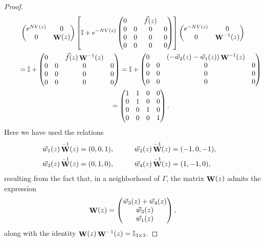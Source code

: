 \documentclass[10pt,a4paper]{amsart}
\DeclareMathOperator{\WW}{{\bf W}}
\begin{document}
\begin{proof}
 \begin{gather*}
 \begin{pmatrix}
 {\rm e}^{NV(z)} & 0 \\
 0 & \WW(z)
 \end{pmatrix}
 \left[
 \mathbb{I} + {\rm e}^{-NV(z)}
 \begin{pmatrix}
 0 & & \vec{f}(z) & \\
 0 & 0 & 0 & 0 \\
 0 & 0 & 0 & 0 \\
 0 & 0 & 0 & 0
 \end{pmatrix}\right]
 \begin{pmatrix}
 {\rm e}^{-NV(z)} & 0 \\
 0 & \WW^{-1}(z)
 \end{pmatrix}\\
 \qquad{}= \mathbb{I} +
 \begin{pmatrix}
 0 & & \vec{f}(z)\WW^{-1}(z) & \\
 0 & 0 & 0 & 0 \\
 0 & 0 & 0 & 0 \\
 0 & 0 & 0 & 0
 \end{pmatrix} = \mathbb{I} +
 \begin{pmatrix}
 0 & & (-\vec{w}_2(z) - \vec{w}_1(z))\WW^{-1}(z) & \\
 0 & 0 & 0 & 0 \\
 0 & 0 & 0 & 0 \\
 0 & 0 & 0 & 0
 \end{pmatrix} \\
 \qquad{}=
 \begin{pmatrix}
 1 & 1 & 0 & 0\\
 0 & 1 & 0 & 0 \\
 0 & 0 & 1 & 0 \\
 0 & 0 & 0 & 1
 \end{pmatrix}.
 \end{gather*}
 Here we have used the relations
 \begin{alignat*}{3}
 &\vec{w}_1(z)\WW^{-1}(z) = (0,0,1), \qquad&& \vec{w}_2(z)\WW^{-1}(z) = (-1,0,-1),&\\
 &\vec{w}_3(z)\WW^{-1}(z) = (0,1,0), \qquad&& \vec{w}_4(z)\WW^{-1}(z) = (1,-1,0),&
 \end{alignat*}
 resulting from the fact that, in a neighborhood of $\Gamma$, the matrix $\WW(z)$ admits the expression
 \begin{equation*}
 \WW(z) =
 \begin{pmatrix}
 \vec{w}_3(z) + \vec{w}_4(z) \\
 \vec{w}_3(z) \\
 \vec{w}_1(z)
 \end{pmatrix},
 \end{equation*}
 along with the identity $\WW(z) \WW^{-1}(z) = \mathbb{I}_{3\times 3}$.
\end{proof}
\end{document}
